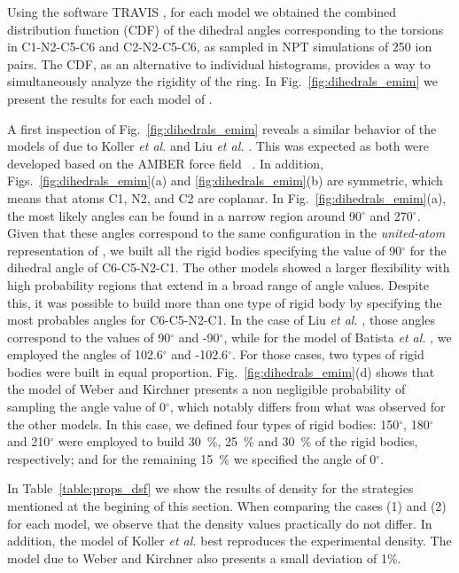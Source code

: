 \documentclass[3p,twocolumn]{elsarticle}
\begin{document}
Using the software TRAVIS \cite{Brehm_2011}, for each model we obtained the combined distribution function (CDF) of the dihedral angles corresponding to the torsions in C1-N2-C5-C6 and C2-N2-C5-C6, as sampled in NPT simulations of 250 ion pairs. The CDF, as an alternative to individual histograms, provides a way to  simultaneously analyze the rigidity of the ring. In Fig.~\ref{fig:dihedrals_emim} we present the results for each model of \ce{[emim][B(CN)_4]}.

A first inspection of Fig.~\ref{fig:dihedrals_emim} reveals a similar behavior of the models of \ce{[emim]^+} due to Koller \textit{et al.} \cite{Koller_2012} and Liu \textit{et al.} \cite{Liu_2014}. This was expected as both were developed based on the AMBER force field ~\cite{Cornell_1995}. In addition, Figs.~\ref{fig:dihedrals_emim}(a) and \ref{fig:dihedrals_emim}(b) are symmetric, which means that atoms C1, N2, and C2 are coplanar. In Fig.~\ref{fig:dihedrals_emim}(a), the most likely angles can be found in a narrow region around 90$^{\circ}$ and 270$^{\circ}$. Given that these angles correspond to the same configuration in the \textit{united-atom} representation of \ce{[emim]^+}, we built all the rigid bodies specifying the value of 90$^{\circ}$ for the dihedral angle of C6-C5-N2-C1. The other models showed a larger flexibility with high probability regions that extend in a broad range of angle values. Despite this, it was possible to build more than one type of rigid body by specifying the most probables angles for C6-C5-N2-C1. In the case of Liu \textit{et al.} \cite{Liu_2014}, those angles correspond to the values of  90$^{\circ}$ and -90$^{\circ}$, while for the model of Batista \textit{et al.} \cite{Batista_2015}, we employed the angles of 102.6$^{\circ}$ and -102.6$^{\circ}$. For those cases, two types of rigid bodies were built in equal proportion. Fig.~\ref{fig:dihedrals_emim}(d) shows that the model of Weber and Kirchner \cite{Weber_2016} presents a non negligible probability of sampling the angle value of 0$^{\circ}$, which notably differs from what was observed for the other models. In this case, we defined four types of rigid bodies: 150$^{\circ}$, 180$^{\circ}$ and 210$^{\circ}$ were employed to build 30~\%, 25~\% and 30~\% of the rigid bodies, respectively; and for the remaining 15~\% we specified the angle of 0$^{\circ}$.

In Table~\ref{table:props_dsf} we show the results of density for the strategies mentioned at the begining of this section. When comparing the cases (1) and (2) for each model, we observe that the density values practically do not differ. In addition, the model of Koller \textit{et al.} \cite{Koller_2012} best reproduces the experimental density. The model due to Weber and Kirchner also presents a small deviation of 1\%. 
\end{document}
